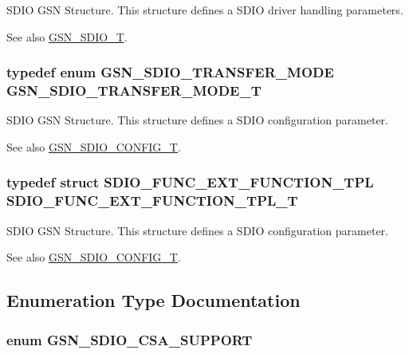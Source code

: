 SDIO GSN Structure. This structure defines a SDIO driver handling parameters. 

\begin{DoxySeeAlso}{See also}
\hyperlink{a00653_gadc47bf5efb9097e51608305810d29895}{GSN\_\-SDIO\_\-T}. 
\end{DoxySeeAlso}
\hypertarget{a00653_gab2867e08a941d7ecdca09fd9cbeff66c}{
\subsubsection[{GSN\_\-SDIO\_\-TRANSFER\_\-MODE\_\-T}]{\setlength{\rightskip}{0pt plus 5cm}typedef enum {\bf GSN\_\-SDIO\_\-TRANSFER\_\-MODE} {\bf GSN\_\-SDIO\_\-TRANSFER\_\-MODE\_\-T}}}
\label{a00653_gab2867e08a941d7ecdca09fd9cbeff66c}


SDIO GSN Structure. This structure defines a SDIO configuration parameter. 

\begin{DoxySeeAlso}{See also}
\hyperlink{a00653_ga741fda4dc2cd93143a8a73ddaace7de8}{GSN\_\-SDIO\_\-CONFIG\_\-T}. 
\end{DoxySeeAlso}
\hypertarget{a00653_ga3df33f78e69366f3c3feccb1b2ca27c4}{
\subsubsection[{SDIO\_\-FUNC\_\-EXT\_\-FUNCTION\_\-TPL\_\-T}]{\setlength{\rightskip}{0pt plus 5cm}typedef struct {\bf SDIO\_\-FUNC\_\-EXT\_\-FUNCTION\_\-TPL} {\bf SDIO\_\-FUNC\_\-EXT\_\-FUNCTION\_\-TPL\_\-T}}}
\label{a00653_ga3df33f78e69366f3c3feccb1b2ca27c4}


SDIO GSN Structure. This structure defines a SDIO configuration parameter. 

\begin{DoxySeeAlso}{See also}
\hyperlink{a00653_ga741fda4dc2cd93143a8a73ddaace7de8}{GSN\_\-SDIO\_\-CONFIG\_\-T}. 
\end{DoxySeeAlso}


\subsection{Enumeration Type Documentation}
\hypertarget{a00653_gaf684dd62de548c59407b206cb1a0251c}{
\subsubsection[{GSN\_\-SDIO\_\-CSA\_\-SUPPORT}]{\setlength{\rightskip}{0pt plus 5cm}enum {\bf GSN\_\-SDIO\_\-CSA\_\-SUPPORT}}}
\label{a00653_gaf684dd62de548c59407b206cb1a0251c}


